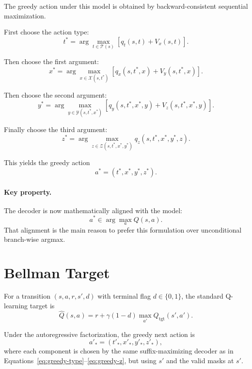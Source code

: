 \documentclass[11pt]{article}
\begin{document}
The greedy action under this model is obtained by backward-consistent sequential maximization.

First choose the action type:
\begin{equation}
\label{eq:greedy-type}
t^*
=
\arg\max_{t \in \mathcal{T}(s)}
\left[
q_t(s,t) + V_x(s,t)
\right].
\end{equation}

Then choose the first argument:
\begin{equation}
\label{eq:greedy-x}
x^*
=
\arg\max_{x \in \mathcal{X}(s,t^*)}
\left[
q_x(s,t^*,x) + V_y(s,t^*,x)
\right].
\end{equation}

Then choose the second argument:
\begin{equation}
\label{eq:greedy-y}
y^*
=
\arg\max_{y \in \mathcal{Y}(s,t^*,x^*)}
\left[
q_y(s,t^*,x^*,y) + V_z(s,t^*,x^*,y)
\right].
\end{equation}

Finally choose the third argument:
\begin{equation}
\label{eq:greedy-z}
z^*
=
\arg\max_{z \in \mathcal{Z}(s,t^*,x^*,y^*)}
q_z(s,t^*,x^*,y^*,z).
\end{equation}

This yields the greedy action
\[
a^* = (t^*,x^*,y^*,z^*).
\]

\paragraph{Key property.}
The decoder is now mathematically aligned with the model:
\[
a^* \in \arg\max_a Q(s,a).
\]
That alignment is the main reason to prefer this formulation over unconditional branch-wise argmax.

\section{Bellman Target}
\label{sec:bellman-target}

For a transition $(s,a,r,s',d)$ with terminal flag $d \in \{0,1\}$, the standard Q-learning target is
\begin{equation}
\label{eq:bellman-target}
\hat{Q}(s,a)
=
r + \gamma (1-d) \max_{a'} Q_{\mathrm{tgt}}(s',a').
\end{equation}

Under the autoregressive factorization, the greedy next action is
\[
a'_* = (t'_*,x'_*,y'_*,z'_*),
\]
where each component is chosen by the same suffix-maximizing decoder as in Equations~\eqref{eq:greedy-type}--\eqref{eq:greedy-z}, but using $s'$ and the valid masks at $s'$.
\end{document}
